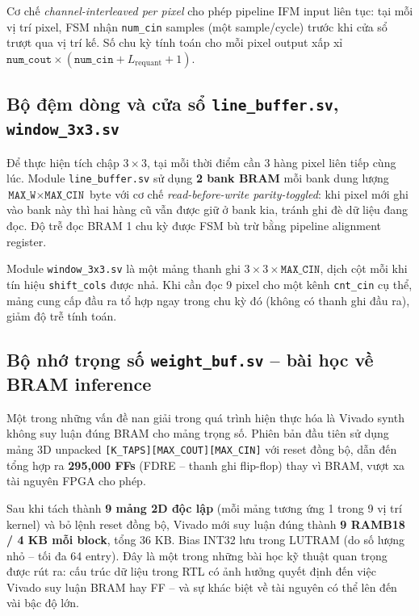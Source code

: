 Cơ chế \textit{channel-interleaved per pixel} cho phép pipeline IFM input liên tục: tại mỗi vị trí pixel, FSM nhận \texttt{num\_cin} samples (một sample/cycle) trước khi cửa sổ trượt qua vị trí kế. Số chu kỳ tính toán cho mỗi pixel output xấp xỉ $\texttt{num\_cout} \times (\texttt{num\_cin} + L_{\mathrm{requant}} + 1)$.

\subsection{Bộ đệm dòng và cửa sổ \texttt{line\_buffer.sv}, \texttt{window\_3x3.sv}}
Để thực hiện tích chập $3 \times 3$, tại mỗi thời điểm cần 3 hàng pixel liên tiếp cùng lúc. Module \texttt{line\_buffer.sv} sử dụng \textbf{2 bank BRAM} mỗi bank dung lượng $\texttt{MAX\_W} \times \texttt{MAX\_CIN}$ byte với cơ chế \textit{read-before-write parity-toggled}: khi pixel mới ghi vào bank này thì hai hàng cũ vẫn được giữ ở bank kia, tránh ghi đè dữ liệu đang đọc. Độ trễ đọc BRAM 1 chu kỳ được FSM bù trừ bằng pipeline alignment register.

Module \texttt{window\_3x3.sv} là một mảng thanh ghi $3 \times 3 \times \texttt{MAX\_CIN}$, dịch cột mỗi khi tín hiệu \texttt{shift\_cols} được nhả. Khi cần đọc 9 pixel cho một kênh \texttt{cnt\_cin} cụ thể, mảng cung cấp đầu ra tổ hợp ngay trong chu kỳ đó (không có thanh ghi đầu ra), giảm độ trễ tính toán.

\subsection{Bộ nhớ trọng số \texttt{weight\_buf.sv} -- bài học về BRAM inference}
\label{ssec:weight_buf_bram}
Một trong những vấn đề nan giải trong quá trình hiện thực hóa là Vivado synth không suy luận đúng BRAM cho mảng trọng số. Phiên bản đầu tiên sử dụng mảng 3D unpacked \texttt{[K\_TAPS][MAX\_COUT][MAX\_CIN]} với reset đồng bộ, dẫn đến tổng hợp ra \textbf{295,000 FFs} (FDRE -- thanh ghi flip-flop) thay vì BRAM, vượt xa tài nguyên FPGA cho phép.

Sau khi tách thành \textbf{9 mảng 2D độc lập} (mỗi mảng tương ứng 1 trong 9 vị trí kernel) và bỏ lệnh reset đồng bộ, Vivado mới suy luận đúng thành \textbf{9 RAMB18 / 4 KB mỗi block}, tổng 36 KB. Bias INT32 lưu trong LUTRAM (do số lượng nhỏ -- tối đa 64 entry). Đây là một trong những bài học kỹ thuật quan trọng được rút ra: cấu trúc dữ liệu trong RTL có ảnh hưởng quyết định đến việc Vivado suy luận BRAM hay FF -- và sự khác biệt về tài nguyên có thể lên đến vài bậc độ lớn.

